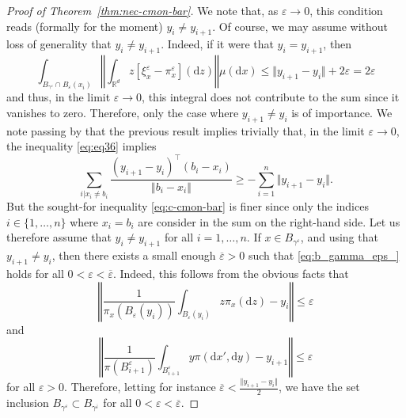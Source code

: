 \documentclass[leqno, 11pt, a4paper]{amsart}
\theoremstyle{definition}
\newcommand{\R}{\mathbb{R}}
\newcommand{\eps}{\varepsilon}
\newcommand{\dd}{\mathrm{d}}
\begin{document}
\begin{proof}[Proof of Theorem~\ref{thm:nec-cmon-bar}]
     We note that, as $\eps \to 0$, this condition reads (formally for the moment) $y_i \neq y_{i+1}$. Of course, we may assume without loss of generality that $y_i \neq y_{i+1}$. Indeed, if it were that $y_i = y_{i+1}$, then
\begin{equation}
    \int_{B_{\gamma^\eps} \cap B_\eps(x_i)} \left\Vert \int_{\R^d} z [\xi^\eps_x - \pi^\eps_x](\dd z) \right\Vert \mu(\dd x) \leq \Vert y_{i+1} - y_i \Vert + 2\eps = 2\eps
\end{equation}
and thus, in the limit $\eps \to 0$, this integral does not contribute to the sum since it vanishes to zero. Therefore, only the case where $y_{i+1} \neq y_i$ is of importance. We note passing by that the previous result implies trivially that, in the limit $\eps \to 0$, the inequality \eqref{eq:eq36} implies
\begin{equation}
\sum_{i | x_i \neq b_i} \frac{(y_{i+1} - y_i)^\intercal(b_i - x_i)}{\Vert b_i - x_i \Vert} \geq -\sum_{i = 1}^n \Vert y_{i+1} -y_{i} \Vert.
\end{equation}
But the sought-for inequality \eqref{eq:c-cmon-bar} is finer since only the indices $i \in \{1, \dots, n\}$ where $x_i = b_i$ are consider in the sum on the right-hand side. Let us therefore assume that $y_i \neq y_{i+1}$ for all $i = 1, \dots,n$. If $x \in B_{\gamma^{\eps}}$, and using that $y_{i+1} \neq y_i$, then there exists a small enough $\overline{\eps} > 0$ such that \eqref{eq:b_gamma_eps_} holds for all $0 < \eps < \overline{\eps}$. Indeed, this follows from the obvious facts that 
$$
\left\Vert\frac{1}{\pi_x(B_\eps(y_i))} \int_{B_\eps(y_i)} z \pi_x(\dd z) - y_i \right\Vert \leq \eps
$$
and 
$$
\left\Vert \frac{1}{\pi(B_{i+1}^\eps)} \int_{B_{i+1}^\eps} y \pi(\dd x', \dd y) -y_{i+1} \right \Vert \leq \eps
$$
for all $\eps > 0$. Therefore, letting for instance $\overline{\eps} < \frac{\Vert y_{i+1} - y_i \Vert}{2}$, we have the set inclusion $B_{\gamma^{\eps}} \subset B_{\gamma^{\overline{\eps}}}$ for all $0 < \eps < \overline{\eps}$. 


\end{proof}
\end{document}
